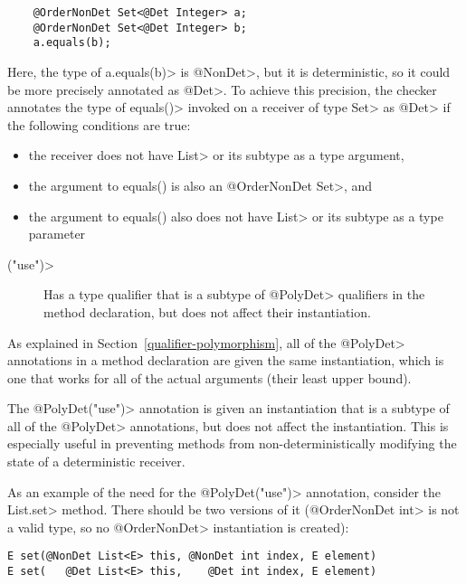 \begin{Verbatim}
    @OrderNonDet Set<@Det Integer> a;
    @OrderNonDet Set<@Det Integer> b;
    a.equals(b);
\end{Verbatim}

Here, the type of \<a.equals(b)> is \<@NonDet>,
but it is deterministic, so it could be more precisely annotated as \<@Det>.
To achieve this precision, the checker annotates the type
of \<equals()> invoked on a receiver of type \<Set> as \<@Det> if the
following conditions are true:
\begin{itemize}
    \item the receiver does not have \<List> or its subtype as a type argument,
    \item the argument to equals() is also an \<@OrderNonDet Set>, and
    \item the argument to equals() also does not have \<List> or its subtype as a
    type parameter
\end{itemize}


\begin{description}
\item[\<("use")>]
  Has a type qualifier that is a subtype of \<@PolyDet> qualifiers in the method
  declaration, but does not affect their instantiation.
\end{description}

As explained in Section~\ref{qualifier-polymorphism},
all of the \<@PolyDet> annotations in a method declaration are given the same
instantiation, which is one that works for all of the actual arguments
(their least upper bound).

The \<@PolyDet("use")> annotation is given an instantiation that is a subtype of all of the
\<@PolyDet> annotations, but does not affect the instantiation. This is especially
useful in preventing methods from non-deterministically modifying the
state of a deterministic receiver.

As an example of the need for the \<@PolyDet("use")> annotation, consider the
\<List.set> method.  There should be two versions of it (\<@OrderNonDet
int> is not a valid type, so no \<@OrderNonDet> instantiation is created):

\begin{Verbatim}
E set(@NonDet List<E> this, @NonDet int index, E element)
E set(   @Det List<E> this,    @Det int index, E element)
\end{Verbatim}

